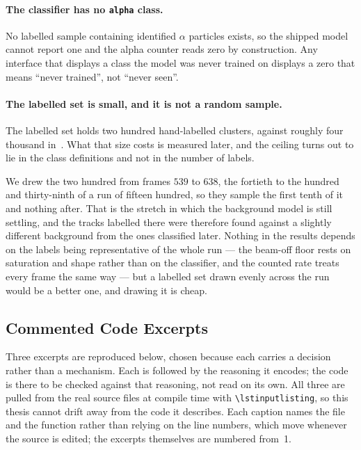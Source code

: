 \documentclass[a4paper,headsepline,oneside,11pt]{scrartcl}
\begin{document}
\paragraph{The classifier has no \texttt{alpha} class.} No labelled sample
containing identified $\alpha$ particles exists, so the shipped model cannot
report one and the alpha counter reads zero by construction. Any interface that
displays a class the model was never trained on displays a zero that means
``never trained'', not ``never seen''.

\paragraph{The labelled set is small, and it is not a random sample.} The
labelled set holds two hundred hand-labelled clusters, against roughly four
thousand in~\cite[Table~8.5]{Filter2018}. What that size costs is measured
later, and the ceiling turns out to lie in the class definitions and not in the
number of labels.

We drew the two hundred from frames $539$ to $638$, the fortieth to the hundred
and thirty-ninth of a run of fifteen hundred, so they sample the first tenth of
it and nothing after. That is the stretch in which the background model is
still settling, and the tracks
labelled there were therefore found against a slightly different background from
the ones classified later. Nothing in the results depends on the labels being
representative of the whole run --- the beam-off floor rests on saturation and
shape rather than on the classifier, and
the counted rate treats every frame the same way --- but a labelled
set drawn evenly across the run would be a better one, and drawing it is cheap.

\subsection{Commented Code Excerpts}
\label{sec:code_excerpts}
Three excerpts are reproduced below, chosen because each carries a decision
rather than a mechanism. Each is followed by the reasoning it encodes; the code
is there to be checked against that reasoning, not read on its own. All three are pulled from the real source files at
compile time with \texttt{\textbackslash lstinputlisting}, so this thesis cannot
drift away from the code it describes. Each caption names the file and the
function rather than relying on the line numbers, which move whenever the source
is edited; the excerpts themselves are numbered from~1.
\end{document}
